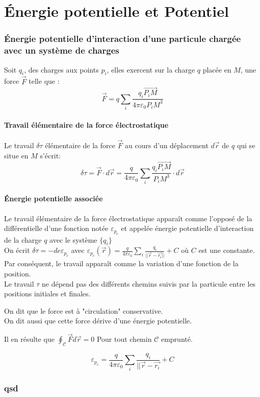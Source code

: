 \documentclass[../main.tex]{subfile}
\begin{document}
\part{Énergie potentielle et Potentiel}

\section{Énergie potentielle d'interaction d'une particule chargée avec un système de charges}

Soit $q_i$, des charges aux points $p_i$, elles exercent sur la charge $q$ placée en $M$, une force $\vec{F}$ telle que :\\
$$\vec{F} = q \sum\limits_i \frac{q_i\vec{P_iM}}{4\pi\varepsilon_0 P_iM^3}$$

\subsection{Travail élémentaire de la force électrostatique}
Le travail $\delta \tau$ élémentaire de la force $\vec{F}$ au cours d'un déplacement $d\vec{r}$ de $q$ qui se situe en $M$ s'écrit:
$$\delta\tau = \vec{F} \cdot d\vec{r} = \frac{q}{4\pi\varepsilon_0} \sum\limits_i \frac{q_i \vec{P_iM}}{P_iM^3} \cdot d\vec{r}$$


\subsection{Énergie potentielle associée}
Le travail élémentaire de la force électrostatique apparaît comme l'opposé de la différentielle d'une fonction notée $\varepsilon_{p_e}$ et appelée énergie potentielle d'interaction de la charge $q$ avec le système $\{q_i\}$\\
On écrit $\delta\tau = -de \varepsilon_{p_e}$ avec $\varepsilon_{p_e}(\vec{r}) = \frac{q}{4\pi\varepsilon_0} \sum\limits_i \frac{q_i}{||\vec{r} - \vec{r_i}||} + C$ où $C$ est une constante.\\

Par conséquent, le travail apparaît comme la variation d'une fonction de la position.\\
Le travail $\tau$ ne dépend pas des différents chemins suivis par la particule entre les positions initiales et finales.\\

\begin{rema}
	On dit que le force est à "circulation" conservative.\\
	On dit aussi que cette force dérive d'une énergie potentielle.
\end{rema}

Il en résulte que $\oint_\mathcal{C} \vec{F} d\vec{r} = 0$
Pour tout chemin $\mathcal{C}$ emprunté.

$$\varepsilon_{p_e} = \frac{q}{4\pi\varepsilon_0} \sum\limits_i \frac{q_i}{||\vec{r} - \vec{r_i}} + C$$

\section{qsd}
\end{document}
